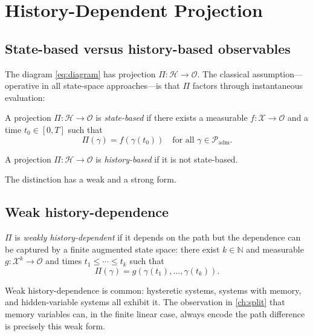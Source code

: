 \documentclass[12pt, oneside]{memoir}
\newcommand{\X}{\mathcal{X}}
\newcommand{\Hcal}{\mathcal{H}}
\newcommand{\OO}{\mathcal{O}}
\newcommand{\Padm}{\mathcal{P}_{\mathrm{adm}}}
\begin{document}
\chapter{History-Dependent Projection}
\label{ch:history}

\section{State-based versus history-based observables}

The diagram \cref{eq:diagram} has projection $\Pi: \Hcal \to \OO$.  The classical
assumption---operative in all state-space approaches---is that $\Pi$ factors through
instantaneous evaluation:

\begin{definition}
A projection $\Pi: \Hcal \to \OO$ is \emph{state-based} if there exists a measurable
$f: \X \to \OO$ and a time $t_0 \in [0,T]$ such that
\[
  \Pi(\gamma) = f(\gamma(t_0)) \quad \text{for all } \gamma \in \Padm.
\]
\end{definition}

\begin{definition}
A projection $\Pi: \Hcal \to \OO$ is \emph{history-based} if it is not state-based.
\end{definition}

The distinction has a weak and a strong form.

\section{Weak history-dependence}

\begin{definition}
$\Pi$ is \emph{weakly history-dependent} if it depends on the path but the dependence
can be captured by a finite augmented state space: there exist $k \in \mathbb{N}$ and
measurable $g: \X^k \to \OO$ and times $t_1 \le \cdots \le t_k$ such that
\[
  \Pi(\gamma) = g(\gamma(t_1), \dots, \gamma(t_k)).
\]
\end{definition}

Weak history-dependence is common: hysteretic systems, systems with memory, and
hidden-variable systems all exhibit it.  The observation in \cref{ch:split} that memory
variables can, in the finite linear case, always encode the path difference is precisely
this weak form.
\end{document}
